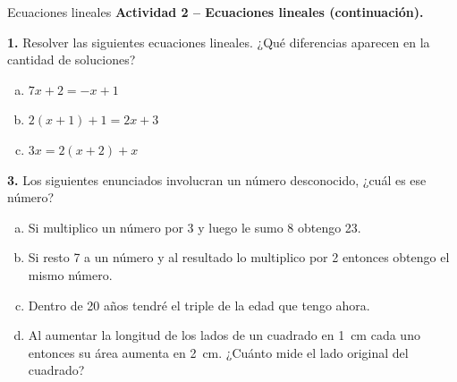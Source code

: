\documentclass[9pt, aspectratio=169]{beamer}
\begin{document}
\begin{frame}{Ecuaciones lineales}
\textbf{Actividad 2 -- Ecuaciones lineales (continuación).}

\textbf{1.} Resolver las siguientes ecuaciones lineales. ¿Qué diferencias aparecen en la cantidad de soluciones?
\begin{multicols}{3}
    \begin{enumerate}[a)]
        \item $7x+2=-x+1$
        \item $2(x+1) + 1 = 2x + 3$
        \item $3x = 2(x+2) + x$
    \end{enumerate}
\end{multicols}

\textbf{3.} Los siguientes enunciados involucran un número desconocido, ¿cuál es ese número?
\begin{enumerate}[a)]
    \item Si multiplico un número por 3 y luego le sumo 8 obtengo 23.
    \item Si resto 7 a un número y al resultado lo multiplico por 2 entonces obtengo el mismo número.
    \item  Dentro de 20 años tendré el triple de la edad que tengo ahora.
    \item  Al aumentar la longitud de los lados de un cuadrado en \qty{1}{cm} cada uno entonces su área aumenta en \qty{2}{cm}. ¿Cuánto mide el lado original del cuadrado?
\end{enumerate}
\end{frame}
\end{document}
